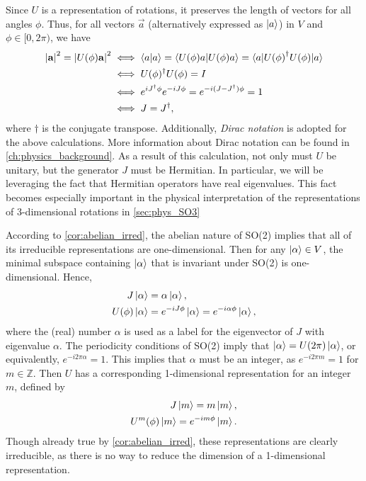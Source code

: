 Since $U$ is a representation of rotations, it preserves the length of vectors for all angles $\phi$. Thus, for all vectors $\vec{a}$ (alternatively expressed as $\ket{a}$) in $V$ and $\phi\in[0,2\pi)$, we have
\begin{align*}
    \left|\mathbf{a}\right|^2 = \left|U(\phi)\mathbf{a}\right|^2
    &\iff \braket{a|a} = \braket{U(\phi)a|U(\phi)a} = \braket{a|{U(\phi)}^\dagger U(\phi)|a} \\
    &\iff U(\phi)^\dagger U(\phi) = I \\
    &\iff e^{iJ^\dagger\phi}e^{-iJ\phi} = e^{-i(J-J^\dagger)\phi} = 1 \\
    &\iff J = J^\dagger,
\end{align*}
where $\dagger$ is the conjugate transpose. Additionally, \textit{Dirac notation} is adopted for the above calculations. More information about Dirac notation can be found in \cref{ch:physics_background}. As a result of this calculation, not only must $U$ be unitary, but the generator $J$ must be Hermitian. In particular, we will be leveraging the fact that Hermitian operators have real eigenvalues. This fact becomes especially important in the physical interpretation of the representations of 3-dimensional rotations in \cref{sec:phys_SO3}

According to \cref{cor:abelian_irred}, the abelian nature of SO(2) implies that all of its irreducible representations are one-dimensional. Then for any $\ket{\alpha}\in V$, the minimal subspace containing $\ket{\alpha}$ that is invariant under SO(2) is one-dimensional. Hence,
\begin{align*}
    J\ket{\alpha} &= \alpha\ket{\alpha}, \\
    U(\phi)\ket{\alpha} &= e^{-iJ\phi}\ket{\alpha} = e^{-i\alpha\phi}\ket{\alpha},
\end{align*}
where the (real) number $\alpha$ is used as a label for the eigenvector of $J$ with eigenvalue $\alpha$. The periodicity conditions of SO(2) imply that $\ket{\alpha} = U(2\pi)\ket{\alpha}$, or equivalently, $e^{-i2\pi\alpha} = 1$. This implies that $\alpha$ must be an integer, as $e^{-i2\pi m} = 1$ for $m\in\mathbb{Z}$. Then $U$ has a corresponding 1-dimensional representation for an integer $m$, defined by
\begin{align*}
    J\ket{m} = m\ket{m}, \\
    U^m(\phi)\ket{m} = e^{-im\phi}\ket{m}.
\end{align*}
Though already true by \cref{cor:abelian_irred}, these representations are clearly irreducible, as there is no way to reduce the dimension of a 1-dimensional representation.

